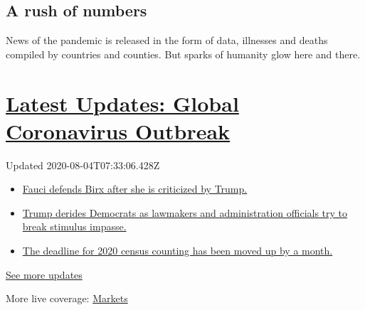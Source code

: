 \hypertarget{a-rush-of-numbers}{%
\subsection{A rush of numbers}\label{a-rush-of-numbers}}

News of the pandemic is released in the form of data, illnesses and
deaths compiled by countries and counties. But sparks of humanity glow
here and there.

\hypertarget{latest-updates-global-coronavirus-outbreak}{%
\section{\texorpdfstring{\href{https://www.nytimes3xbfgragh.onion/2020/08/03/world/coronavirus-covid-19.html?action=click\&pgtype=Article\&state=default\&region=MAIN_CONTENT_1\&context=storylines_live_updates}{Latest
Updates: Global Coronavirus
Outbreak}}{Latest Updates: Global Coronavirus Outbreak}}\label{latest-updates-global-coronavirus-outbreak}}

Updated 2020-08-04T07:33:06.428Z

\begin{itemize}
\tightlist
\item
  \href{https://www.nytimes3xbfgragh.onion/2020/08/03/world/coronavirus-covid-19.html?action=click\&pgtype=Article\&state=default\&region=MAIN_CONTENT_1\&context=storylines_live_updates\#link-4547638f}{Fauci
  defends Birx after she is criticized by Trump.}
\item
  \href{https://www.nytimes3xbfgragh.onion/2020/08/03/world/coronavirus-covid-19.html?action=click\&pgtype=Article\&state=default\&region=MAIN_CONTENT_1\&context=storylines_live_updates\#link-15e7f995}{Trump
  derides Democrats as lawmakers and administration officials try to
  break stimulus impasse.}
\item
  \href{https://www.nytimes3xbfgragh.onion/2020/08/03/world/coronavirus-covid-19.html?action=click\&pgtype=Article\&state=default\&region=MAIN_CONTENT_1\&context=storylines_live_updates\#link-e5a2cda}{The
  deadline for 2020 census counting has been moved up by a month.}
\end{itemize}

\href{https://www.nytimes3xbfgragh.onion/2020/08/03/world/coronavirus-covid-19.html?action=click\&pgtype=Article\&state=default\&region=MAIN_CONTENT_1\&context=storylines_live_updates}{See
more updates}

More live coverage:
\href{https://www.nytimes3xbfgragh.onion/live/2020/08/03/business/stock-market-today-coronavirus?action=click\&pgtype=Article\&state=default\&region=MAIN_CONTENT_1\&context=storylines_live_updates}{Markets}

